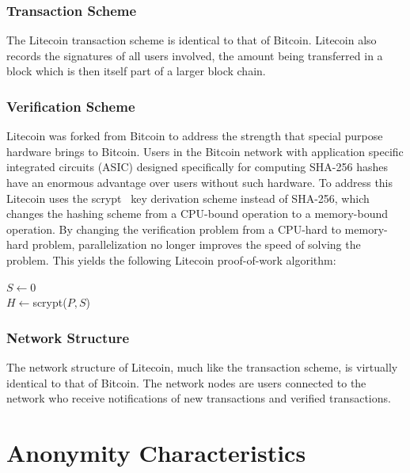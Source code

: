 \documentclass[11pt]{article}
\begin{document}
\subsubsection{Transaction Scheme} The Litecoin transaction scheme is identical to that of Bitcoin. Litecoin also
records the signatures of all users involved, the amount being transferred in a block which is then itself part of a
larger block chain.

\subsubsection{Verification Scheme} Litecoin was forked from Bitcoin to address the strength that special purpose
hardware brings to Bitcoin. Users in the Bitcoin network with application specific integrated circuits (ASIC) designed
specifically for computing SHA-256 hashes have an enormous advantage over users without such hardware. To address this
Litecoin uses the scrypt~\cite{percival09} key derivation scheme instead of SHA-256, which changes the hashing scheme
from a CPU-bound operation to a memory-bound operation. By changing the verification problem from a CPU-hard to
memory-hard problem, parallelization no longer improves the speed of solving the problem. This yields the following
Litecoin proof-of-work algorithm:
\begin{algorithm}
    $S \gets 0$\\
    $H \gets ${\sc scrypt($P, S$)}\\
\end{algorithm}

\subsubsection{Network Structure}
The network structure of Litecoin, much like the transaction scheme, is virtually identical to that of Bitcoin. The
network nodes are users connected to the network who receive notifications of new transactions and verified
transactions.

\section{Anonymity Characteristics}
\end{document}

